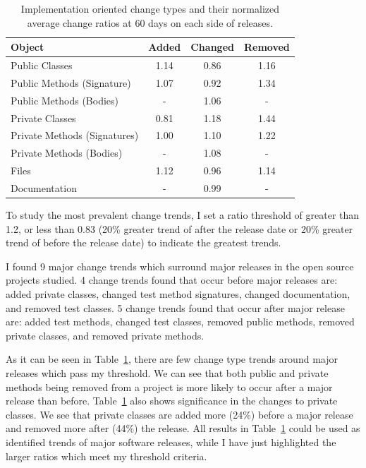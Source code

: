 \begin{table}[ht]
\begin{center}
\tabcolsep=0.11cm
\begin{tabular}{| l | c | c | c |}
\hline
Object & Added & Changed & Removed\\
\hline
Public Classes & 1.14 & 0.86 & 1.16 \\
Public Methods (Signature) & 1.07 & 0.92 & 1.34 \\
Public Methods (Bodies) & - & 1.06 & - \\
Private Classes & 0.81 & 1.18 & 1.44 \\
Private Methods (Signatures) & 1.00 & 1.10 & 1.22 \\
Private Methods (Bodies) & - & 1.08 & - \\
Files & 1.12 & 0.96 & 1.14 \\
Documentation & - & 0.99 & - \\
\hline
\end{tabular}
\end{center}
\caption{Implementation oriented change types and their normalized average change ratios at 60 days on each side of releases. \label{tab:apie-ratio}}
\end{table}

To study the most prevalent change trends, I set a ratio threshold of greater than 1.2, or less than 0.83 (20\% greater trend of after the release date
or 20\% greater trend of before the release date) to indicate the greatest trends.

I found 9 major change trends which surround major releases in the open source
projects studied. 4 change trends found that occur before major releases are: added private classes, 
changed test method signatures, changed documentation, and removed test classes.
5 change trends found that occur after major release are: added test methods, changed test classes, removed public methods, removed
private classes, and removed private methods.

As it can be seen in Table~\ref{tab:apie-ratio}, there are few change type trends around major releases which pass my threshold. We can see that both public
and private methods
being removed from a project is more likely to occur after a major release than before. Table~\ref{tab:apie-ratio} also shows significance in the changes to private
classes. We see that private classes are added more (24\%) before a major release and removed more after (44\%) the release. 
All results in Table~\ref{tab:apie-ratio} could be used as identified trends of major software releases, while I have just highlighted the larger ratios
which meet my threshold criteria.


